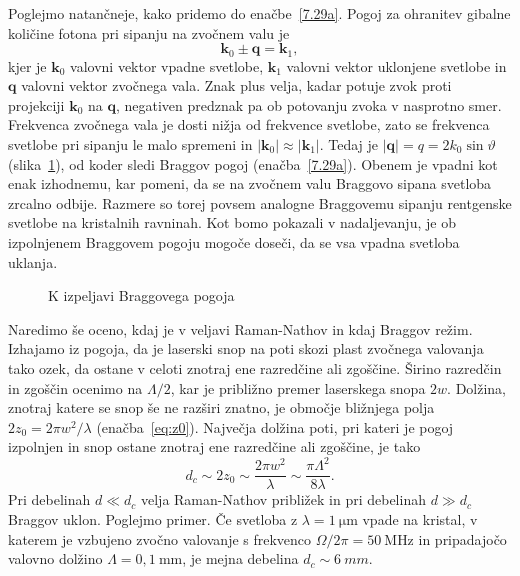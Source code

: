 Poglejmo natančneje, kako pridemo do enačbe~\ref{7.29a}. Pogoj
za ohranitev gibalne količine fotona pri sipanju na zvočnem valu je
\begin{equation}
\mathbf{k}_{0}\pm\mathbf{q}=\mathbf{k}_{1},
\label{7.30}
\end{equation}
kjer je $\mathbf{k}_{0}$ valovni vektor vpadne svetlobe, $\mathbf{k}_{1}$
valovni vektor uklonjene svetlobe in $\mathbf{q}$ valovni
vektor zvočnega vala. Znak plus velja, kadar potuje zvok proti projekciji
$\mathbf{k}_{0}$ na $\mathbf{q}$, negativen predznak pa ob potovanju zvoka v nasprotno smer. 
Frekvenca zvočnega vala je dosti nižja od frekvence svetlobe, zato se frekvenca svetlobe 
pri sipanju le malo spremeni in $|\mathbf{k}_{0}| \approx |\mathbf{k}_{1}|$.
Tedaj je $|\mathbf{q}| = q=2k_{0}\sin\vartheta$ 
(slika~\ref{fig:ao_bragg3}), od koder sledi Braggov pogoj 
(enačba~\ref{7.29a}). Obenem je vpadni kot enak izhodnemu, kar pomeni, da se na
zvočnem valu Braggovo sipana svetloba zrcalno odbije. Razmere so torej
povsem analogne Braggovemu sipanju rentgenske svetlobe na kristalnih
ravninah. Kot bomo pokazali v nadaljevanju, je ob izpolnjenem Braggovem pogoju mogoče doseči, 
da se vsa vpadna svetloba uklanja.
\begin{figure}[h]
\centering
\def\svgwidth{40truemm} 

\caption{K izpeljavi Braggovega pogoja}
\label{fig:ao_bragg3}
\end{figure}
\begin{remark}
Naredimo še oceno, kdaj je v veljavi Raman-Nathov in kdaj Braggov režim. 
Izhajamo iz pogoja, da je laserski snop na poti skozi plast zvočnega 
valovanja tako ozek, da ostane v celoti znotraj
ene razredčine ali zgoščine. Širino razredčin in zgoščin ocenimo na $\Lambda/2$, kar je  
približno premer laserskega snopa $2w$. Dolžina, znotraj katere se snop še ne razširi znatno,
je območje bližnjega polja $2z_0 = 2 \pi w^2/\lambda$ (enačba~\ref{eq:z0}). Največja dolžina poti, pri 
kateri je pogoj izpolnjen in snop ostane znotraj ene razredčine ali zgoščine, je tako
\begin{equation}
d_c \sim 2z_0 \sim \frac{2 \pi w^2}{\lambda} \sim \frac{\pi \Lambda^2}{8 \lambda}.
\end{equation}
Pri debelinah $d \ll d_c$ velja Raman-Nathov približek in pri debelinah $d \gg d_c$ Braggov uklon.
Poglejmo primer. Če svetloba z $\lambda = 1~\si{\micro\metre}$ vpade na kristal, 
v katerem je vzbujeno zvočno valovanje s frekvenco $\Omega/2\pi = 50~\si{\mega\hertz}$ in
pripadajočo valovno dolžino $\Lambda = 0,1~\si{\milli\metre}$, je mejna debelina $d_c \sim 6~\si{mm}$.
\end{remark}

